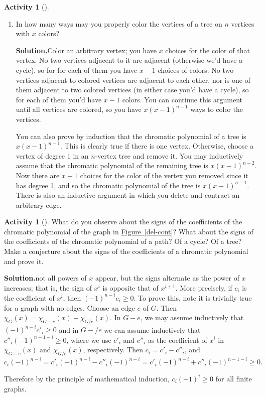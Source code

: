 \documentclass[10pt,]{book}
\theoremstyle{plain}
\theoremstyle{definition}
\newtheorem{activity}[project]{Activity}
\numberwithin{equation}{chapter}
\begin{document}
\begin{activity}[]
\begin{enumerate}[label=(\alph*)]
~\par
\item In how many ways may you properly color the vertices of a tree on \(n\) vertices with \(x\) colors?%
\par\medskip\noindent%
\textbf{Solution.}\quad Color an arbitrary vertex; you have \(x\) choices for the color of that vertex. No two vertices adjacent to it are adjacent (otherwise we'd have a cycle), so for for each of them you have \(x-1\) choices of colors. No two vertices adjacent to colored vertices are adjacent to each other, nor is one of them adjacent to two colored vertices (in either case you'd have a cycle), so for each of them you'd have \(x-1\) colors. You can continue this argument until all vertices are colored, so you have \(x(x-1)^{n-1}\) ways to color the vertices.%
\par
You can also prove by induction that the chromatic polynomial of a tree is \(x(x-1)^{n-1}\). This is clearly true if there is one vertex. Otherwise, choose a vertex of degree 1 in an \(n\)-vertex tree and remove it. You may inductively assume that the chromatic polynomial of the remaining tree is \(x(x-1)^{n-2}\). Now there are \(x-1\) choices for the color of the vertex you removed since it has degree 1, and so the chromatic polynomial of the tree is \(x(x-1)^{n-1}\). There is also an inductive argument in which you delete and contract an arbitrary edge.%

\end{enumerate}
\end{activity}
\begin{activity}[]\label{activity-117}
What do you observe about the signs of the coefficients of the chromatic polynomial of the graph in \hyperref[del-cont]{Figure~\ref{del-cont}}? What about the signs of the coefficients of the chromatic polynomial of a path? Of a cycle? Of a tree? Make a conjecture about the signs of the coefficients of a chromatic polynomial and prove it.%
\par\medskip\noindent%
\textbf{Solution.}\quad not all powers of \(x\) appear, but the signs alternate as the power of \(x\) increases; that is, the sign of \(x^i\) is opposite that of \(x^{i+1}\). More precisely, if \(c_i\) is the coefficient of \(x^i\), then \((-1)^{n-i}c_i\ge 0\). To prove this, note it is trivially true for a graph with no edges. Choose an edge \(e\) of \(G\). Then \(\chi_G(x) =
\chi_{G-e}(x)-\chi_{G/e}(x)\). In \(G-e\), we may assume inductively that \((-1)^{n-i}c'_i\ge0\) and in \(G-/e\) we can assume inductively that \(c''_i(-1)^{n-1-i}\ge0\), where we use \(c'_i\) and \(c''_i\) as the coefficient of \(x^i\) in \(\chi_{G-e}(x)\) and \(\chi_{G/e}(x)\), respectively. Then \(c_i=c'_i
-c''_i\), and%
\begin{equation*}
c_i(-1)^{n-i}=c'_i(-1)^{n-i}-c''_i(-1)^{n-i}=c'_i(-1)^{n-i}+c''_i(-1)^{n-1-i}
\ge0.
\end{equation*}
%
\par
Therefore by the principle of mathematical induction, \(c_i(-1)^i\ge0\) for all finite graphs.%
\end{activity}
\end{document}
